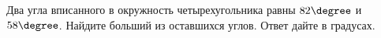 \begin{ex}
	\begin{condition}
		Два угла вписанного в окружность четырехугольника равны \( 82\degree \) и \( 58\degree \). Найдите больший из оставшихся углов. Ответ дайте в градусах.
	\end{condition}
\end{ex}